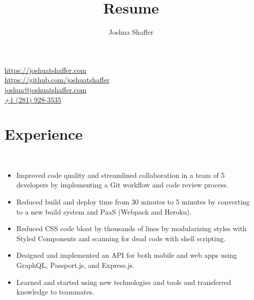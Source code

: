 \documentclass{resume}
\title{Resume}
\author{Joshua Shaffer}
\begin{document}
{\Huge\bfseries\theauthor}
\hfill
\begin{contactInfo}
    \href{https://joshuatshaffer.com}{https://joshuatshaffer.com} \\
    \href{https://github.com/joshuatshaffer}{https://github.com/joshuatshaffer} \\
    \href{mailto:joshua@joshuatshaffer.com}{joshua@joshuatshaffer.com} \\
    \href{tel:+12819283535}{+1 (281) 928-3535}
\end{contactInfo}

\section{Experience}

 \\

\begin{itemize}
    \item Improved code quality and streamlined collaboration in a team of 5
          developers by implementing a Git workflow and code review process.
    \item Reduced build and deploy time from 30 minutes to 5 minutes by
          converting to a new build system and PaaS (Webpack and Heroku).
    \item Reduced CSS code bloat by thousands of lines by modularizing
          styles with Styled Components and scanning for dead code with
          shell scripting.
    \item Designed and implemented an API for both mobile and web apps using
          GraphQL, Passport.js, and Express.js.
    \item Learned and started using new technologies and tools and
          transferred knowledge to teammates.
\end{itemize}
\end{document}
